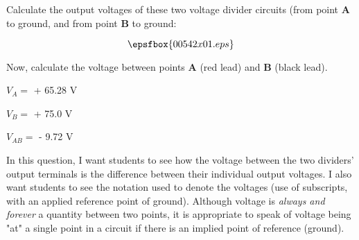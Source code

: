

Calculate the output voltages of these two voltage divider circuits (from point {\bf A} to ground, and from point {\bf B} to ground:

$$\epsfbox{00542x01.eps}$$

Now, calculate the voltage between points {\bf A} (red lead) and {\bf B} (black lead).







$V_A =$ + 65.28 V

$V_B =$ + 75.0 V

$V_{AB} =$ - 9.72 V







In this question, I want students to see how the voltage between the two dividers' output terminals is the difference between their individual output voltages.  I also want students to see the notation used to denote the voltages (use of subscripts, with an applied reference point of ground).  Although voltage is {\it always and forever} a quantity between two points, it is appropriate to speak of voltage being "at" a single point in a circuit if there is an implied point of reference (ground).




